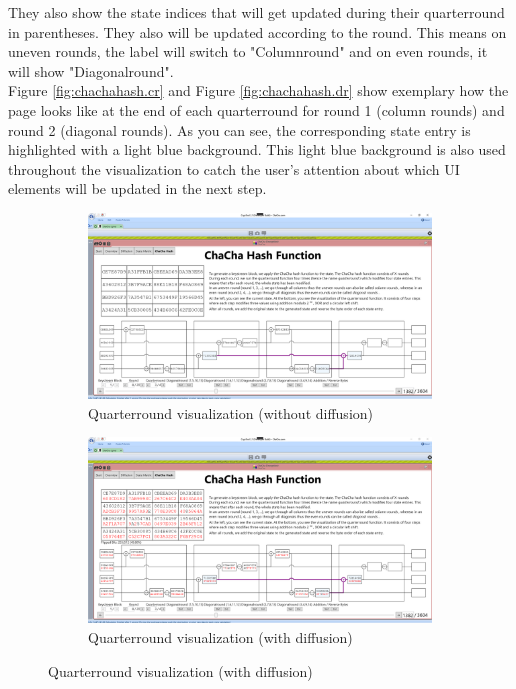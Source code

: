 They also show the state indices that will get updated during their quarterround in parentheses. They also will be updated according to the round. This means on uneven rounds, the label will switch to "Columnround" and on even rounds, it will show "Diagonalround". \\
Figure \ref{fig:chachahash.cr} and Figure \ref{fig:chachahash.dr} show exemplary how the page looks like at the end of each quarterround for round 1 (column rounds) and round 2 (diagonal rounds). As you can see, the corresponding state entry is highlighted with a light blue background. This light blue background is also used throughout the visualization to catch the user's attention about which UI elements will be updated in the next step.\\

\begin{figure}
\caption[Quarterround visualization]{Quarterround visualization during ChaCha hash function}
\label{fig:chachahash.mid.qr}
\centering
\begin{subfigure}{\textwidth}
  \centering
  \includegraphics[width=\textwidth]{figures/ct2/chachahash/chachahash-mid-qr.png}
  \caption{Quarterround visualization (without diffusion)}
  \label{fig:chachahash.mid.qr.without.diffusion}
\end{subfigure}
\begin{subfigure}{\textwidth}
  \centering
  \includegraphics[width=\textwidth]{figures/ct2/chachahash/chachahash-mid-qr-diffusion.png}
  \caption{Quarterround visualization (with diffusion)}
  \label{fig:chachahash.mid.qr.with.diffusion}
\end{subfigure}
\end{figure}

